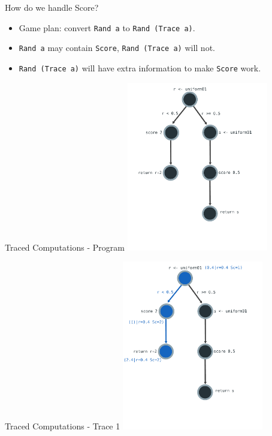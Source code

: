 \documentclass{beamer}
\newcommand{\hsmint}[1]{\texttt{#1}}
\begin{document}
\begin{frame}[fragile]{How do we handle Score?}
    \begin{itemize}
        \item Game plan: convert \hsmint{Rand a} to \hsmint{Rand (Trace a)}.
        \item \hsmint{Rand a} may contain \hsmint{Score}, \hsmint{Rand (Trace a)} will not.
        \item \hsmint{Rand (Trace a)} will have extra information to make \hsmint{Score} work.
\end{itemize}
\end{frame}

\begin{frame}[fragile]{Traced Computations - Program}
\includegraphics[height=280px]{res/program-1.pdf}
\end{frame}

\begin{frame}[fragile]{Traced Computations - Trace 1}
\includegraphics[height=280px]{res/program-2.pdf}
\end{frame}
\end{document}
